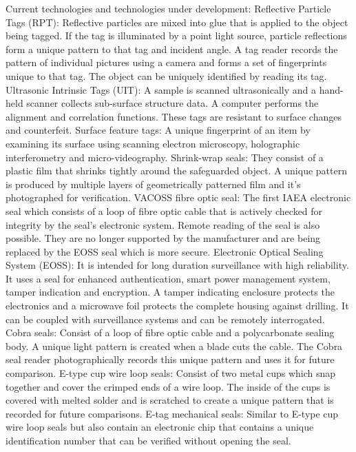 \documentclass[twoside,titlepage,11pt,twocolumn,a4paper]{article}
\begin{document}
Current technologies and technologies under development:
\citep{zarimpas2003} Reflective Particle Tags (RPT): Reflective
particles are mixed into glue that is applied to the object being
tagged. If the tag is illuminated by a point light source, particle
reflections form a unique pattern to that tag and incident angle. A
tag reader records the pattern of individual pictures using a camera
and forms a set of fingerprints unique to that tag. The object can be
uniquely identified by reading its tag. \citep{ellis2007} Ultrasonic
Intrinsic Tags (UIT): A sample is scanned ultrasonically and a
hand-held scanner collects sub-surface structure data. A computer
performs the alignment and correlation functions. These tags are
resistant to surface changes and counterfeit.  Surface feature tags: A
unique fingerprint of an item by examining its surface using scanning
electron microscopy, holographic interferometry and micro-videography.
Shrink-wrap seals: They consist of a plastic film that shrinks tightly
around the safeguarded object. A unique pattern is produced by
multiple layers of geometrically patterned film and it’s photographed
for verification.  VACOSS fibre optic seal: The first IAEA electronic
seal which consists of a loop of fibre optic cable that is actively
checked for integrity by the seal’s electronic system. Remote reading
of the seal is also possible. They are no longer supported by the
manufacturer and are being replaced by the EOSS seal which is more
secure. \citep{IAEAsafeguards2011} Electronic Optical Sealing System
(EOSS): It is intended for long duration surveillance with high
reliability. It uses a seal for enhanced authentication, smart power
management system, tamper indication and encryption. A tamper
indicating enclosure protects the electronics and a microwave foil
protects the complete housing against drilling. It can be coupled with
surveillance systems and can be remotely
interrogated. \citep{IAEAsafeguards2011} Cobra seals: Consist of a
loop of fibre optic cable and a polycarbonate sealing body. A unique
light pattern is created when a blade cuts the cable. The Cobra seal
reader photographically records this unique pattern and uses it for
future comparison.  E-type cup wire loop seals: Consist of two metal
cups which snap together and cover the crimped ends of a wire
loop. The inside of the cups is covered with melted solder and is
scratched to create a unique pattern that is recorded for future
comparisons.  E-tag mechanical seals: Similar to E-type cup wire loop
seals but also contain an electronic chip that contains a unique
identification number that can be verified without opening the seal.
\end{document}
